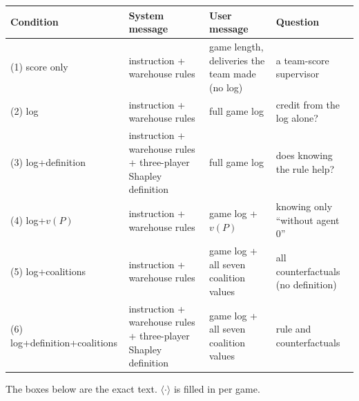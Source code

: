 \documentclass[letterpaper]{article} %
\begin{document}
\noindent\begin{minipage}{\textwidth}
\centering
\footnotesize
\setlength{\tabcolsep}{4pt}
\begin{tabular}{@{}p{3.9cm}p{3.9cm}p{4.9cm}p{4.4cm}@{}}
\toprule
Condition & System message & User message & Question \\
\midrule
(1) score only & instruction + warehouse rules & game length, deliveries the team made (no log) & a team-score supervisor \\
(2) log & instruction + warehouse rules & full game log & credit from the log alone? \\
(3) log+definition & instruction + warehouse rules + three-player Shapley definition & full game log & does knowing the rule help? \\
(4) log+$v(P)$ & instruction + warehouse rules & game log + $v(P)$ & knowing only ``without agent 0'' \\
(5) log+coalitions & instruction + warehouse rules & game log + all seven coalition values & all counterfactuals (no definition) \\
(6) log+definition+coalitions & instruction + warehouse rules + three-player Shapley definition & game log + all seven coalition values & rule and counterfactuals \\
\bottomrule
\end{tabular}
\label{tab:prompts_rware}
\end{minipage}\par\medskip

The boxes below are the exact text. $\langle\cdot\rangle$ is filled in per game.

\newcommand{\promptbox}[2]{\par\smallskip\noindent\textbf{#1}\par\noindent
  \fbox{\parbox{\dimexpr\textwidth-2\fboxsep-2\fboxrule}{\scriptsize\ttfamily #2}}\par\smallskip}
\end{document}
